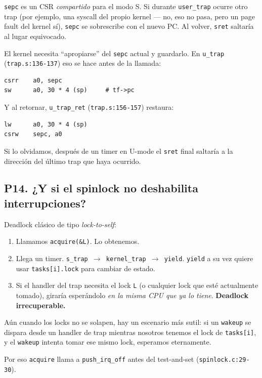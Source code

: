 \documentclass[11pt,a4paper]{article}
\begin{document}
\begin{respuesta}
\texttt{sepc} es un CSR \emph{compartido} para el modo S. Si
durante \texttt{user\_trap} ocurre otro trap (por ejemplo, una
syscall del propio kernel — no, eso no pasa, pero un page fault
del kernel sí), \texttt{sepc} se sobrescribe con el nuevo PC. Al
volver, \texttt{sret} saltaría al lugar equivocado.

El kernel necesita ``apropiarse'' del \texttt{sepc} actual y
guardarlo. En \texttt{u\_trap} (\texttt{trap.s:136-137}) eso se
hace antes de la llamada:

\begin{lstlisting}[style=asmstyle]
csrr    a0, sepc
sw      a0, 30 * 4 (sp)     # tf->pc
\end{lstlisting}

Y al retornar, \texttt{u\_trap\_ret} (\texttt{trap.s:156-157})
restaura:

\begin{lstlisting}[style=asmstyle]
lw      a0, 30 * 4 (sp)
csrw    sepc, a0
\end{lstlisting}

Si lo olvidamos, después de un timer en U-mode el \texttt{sret}
final saltaría a la dirección del último trap que haya ocurrido.
\end{respuesta}

\subsection*{P14. ¿Y si el spinlock no deshabilita interrupciones?}

\begin{respuesta}
Deadlock clásico de tipo \emph{lock-to-self}:

\begin{enumerate}[leftmargin=*,nosep]
    \item Llamamos \texttt{acquire(\&L)}. Lo obtenemos.
    \item Llega un timer. \texttt{s\_trap $\to$ kernel\_trap $\to$
        yield}. \texttt{yield} a su vez quiere usar
        \texttt{tasks[i].lock} para cambiar de estado.
    \item Si el handler del trap necesita el lock \texttt{L} (o
        cualquier lock que esté actualmente tomado), giraría
        esperándolo \emph{en la misma CPU que ya lo tiene}.
        \textbf{Deadlock irrecuperable.}
\end{enumerate}

Aún cuando los locks no se solapen, hay un escenario más sutil:
si un \texttt{wakeup} se dispara desde un handler de trap mientras
nosotros tenemos el lock de \texttt{tasks[i]}, y el \texttt{wakeup}
intenta tomar ese mismo lock, esperamos eternamente.

Por eso \texttt{acquire} llama a \texttt{push\_irq\_off} antes del
test-and-set (\texttt{spinlock.c:29-30}).
\end{respuesta}
\end{document}
